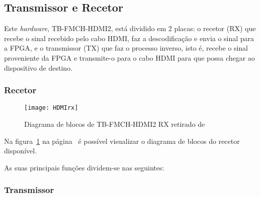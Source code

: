 \subsection{Transmissor e Recetor} \label{batik}
Este \textit{hardware}, TB-FMCH-HDMI2, está dividido em 2 placas: o recetor (RX) que recebe o sinal recebido pelo cabo HDMI, faz a descodificação e envia o sinal para a FPGA, e o transmissor (TX) que faz o processo inverso, isto é, recebe o sinal proveniente da FPGA e transmite-o para o cabo HDMI para que possa chegar ao dispositivo de destino. 
\subsubsection{Recetor}\label{batik}
\begin{figure}[h!]
	\begin{center}
		\leavevmode
		\texttt{[image: HDMIrx]}
		\caption{Diagrama de blocos de TB-FMCH-HDMI2 RX retirado de \cite{R009}}
		\label{fig:HDMIblocosRX}
	\end{center}
\end{figure}

Na figura~\ref{fig:HDMIblocosRX} na página~\pageref{fig:HDMIblocosRX} é possível visualizar o diagrama de blocos do recetor disponível.



As suas principais funções dividem-se nas seguintes:
\subsubsection{Transmissor}\label{batik} 
